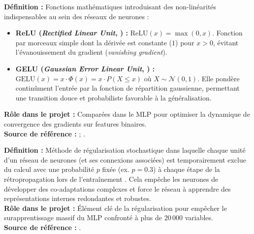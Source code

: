 \documentclass[11pt,a4paper]{article}
\begin{document}
\begin{defbox}
\textbf{Définition :} Fonctions mathématiques introduisant des non-linéarités indispensables au sein des réseaux de neurones :
\begin{itemize}[leftmargin=*, label=$\bullet$]
    \item \textbf{ReLU (\textit{Rectified Linear Unit}, \citet{nair2010rectified}) :} $\text{ReLU}(x) = \max(0, x)$. Fonction par morceaux simple dont la dérivée est constante ($1$) pour $x > 0$, évitant l'évanouissement du gradient (\textit{vanishing gradient}).
    \item \textbf{GELU (\textit{Gaussian Error Linear Unit}, \citet{hendrycks2016gelu}) :} $\text{GELU}(x) = x \cdot \Phi(x) = x \cdot P(X \le x)$ où $X \sim \mathcal{N}(0, 1)$. Elle pondère continûment l'entrée par la fonction de répartition gaussienne, permettant une transition douce et probabiliste favorable à la généralisation.
\end{itemize}
\textbf{Rôle dans le projet :} Comparées dans le MLP pour optimiser la dynamique de convergence des gradients sur features binaires.\\
\textbf{Source de référence :} \citet{nair2010rectified} ; \citet{hendrycks2016gelu}.
\end{defbox}

\begin{defbox}[Dropout]
\textbf{Définition :} Méthode de régularisation stochastique dans laquelle chaque unité d'un réseau de neurones (et ses connexions associées) est temporairement exclue du calcul avec une probabilité $p$ fixée (ex. $p=0.3$) à chaque étape de la rétropropagation lors de l'entraînement \citep{srivastava2014dropout}. Cela empêche les neurones de développer des co-adaptations complexes et force le réseau à apprendre des représentations internes redondantes et robustes.\\
\textbf{Rôle dans le projet :} Élément clé de la régularisation pour empêcher le surapprentissage massif du MLP confronté à plus de $20\,000$ variables.\\
\textbf{Source de référence :} \citet{srivastava2014dropout}.
\end{defbox}
\end{document}
